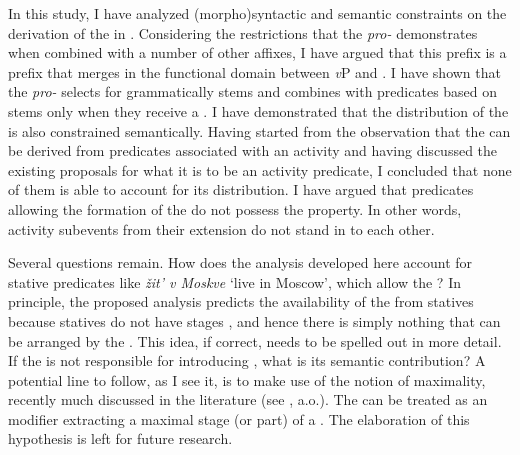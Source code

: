 \documentclass[output=paper,colorlinks,citecolor=brown,newtxmath]{langsci/langscibook}
\begin{document}
In this study, I have analyzed (morpho)syntactic and semantic constraints on the derivation of the  in . Considering the restrictions that the  \textit{pro-} demonstrates when combined with a number of other affixes, I have argued that this prefix is a  prefix that merges in the functional domain between \textit{v}P and . I have shown that the  \textit{pro-} selects for grammatically  stems and combines with predicates based on   stems only when they receive a . I have demonstrated that the distribution of the  is also constrained semantically. Having started from the observation that the  can be derived from predicates associated with an activity  and having discussed the existing proposals for what it is to be an activity predicate, I concluded that none of them is able to account for its distribution. I have argued that predicates allowing the formation of the  do not possess the  property. In other words, activity subevents from their extension do not stand in   to each other.

Several questions remain. How does the analysis developed here account for stative predicates like \textit{žit’ v Moskve} `live in Moscow', which allow the ? In principle, the proposed analysis predicts the availability of the  from statives because statives do not have stages \citep{landman1992progressive}, and hence there is simply nothing that can be arranged by the . This idea, if correct, needs to be spelled out in more detail. If the  is not responsible for introducing , what is its semantic contribution? A potential line to follow, as I see it, is to make use of the notion of maximality, recently much discussed in the literature (see \citealt{altshuler2014,filip2017semantics}, a.o.). The  can be treated as an  modifier extracting a maximal stage (or part) of a . The elaboration of this hypothesis is left for future research.
\end{document}
